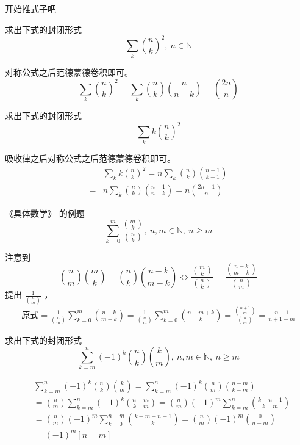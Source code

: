 \documentclass[UTF8]{beamer}
\begin{document}
    \begin{frame}
        \sout{开始推式子吧}
        \begin{block}{求出下式的封闭形式}\vspace{-1em}
            $$\sum_k\binom nk^2,\ n\in\mathbb{N}$$
            \vspace{-1em}
        \end{block}
        \pause
        对称公式之后范德蒙德卷积即可。
        $$\sum_k\binom nk^2=\sum_k\binom nk\binom n{n-k}=\binom{2n}n$$
    \end{frame}
    \begin{frame}
        \begin{block}{求出下式的封闭形式}
            $$\sum_kk\binom nk^2$$
        \end{block}
        \pause
        吸收律之后对称公式之后范德蒙德卷积即可。
        \begin{align*}
              & \sum_kk\binom nk^2=n\sum_k\binom nk\binom {n-1}{k-1}\\
            = & n\sum_k\binom nk\binom {n-1}{n-k}=n\binom{2n-1}{n}
        \end{align*}
    \end{frame}
    \begin{frame}
        \begin{block}{《具体数学》 的例题}
            $$\sum_{k=0}^m\frac{\binom mk}{\binom nk},\ n,m\in\mathbb{N},\ n\geq m$$
        \end{block}
        \pause
        注意到
        $$\binom nm\binom mk=\binom nk\binom{n-k}{m-k}\iff\frac{\binom mk}{\binom nk}=\frac{\binom{n-k}{m-k}}{\binom nm}$$
        提出 $\frac{1}{\binom nm}$ ，
        $$
        \begin{aligned}
            \text{原式}=\frac{1}{\binom{n}{m}}\sum_{k=0}^m\binom{n-k}{m-k}=\frac{1}{\binom{n}{m}}\sum_{k=0}^m\binom{n-m+k}{k}=\frac{\binom{n+1}{m}}{\binom nm}=\frac {n+1}{n+1-m}
        \end{aligned}
        $$
    \end{frame}

    \begin{frame}
        \begin{block}{求出下式的封闭形式}\vspace{-1em}
            $$\sum_{k=m}^n(-1)^{k}\binom nk\binom km,\ n,m\in\mathbb{N},\ n\geq m$$
        \end{block}
        \vspace{-1em}
        \pause
        $$
        \begin{aligned}
            & \sum_{k=m}^n(-1)^k\binom nk\binom km =\sum_{k=m}^n(-1)^k\binom nm\binom{n-m}{k-m}\\
            & =\binom nm\sum_{k=m}^n(-1)^k\binom{n-m}{k-m}=\binom nm(-1)^m\sum_{k=m}^n\binom {k-n-1}{k-m}\\
            & =\binom nm(-1)^m\sum_{k=0}^{n-m}\binom{k+m-n-1}{k}=\binom nm(-1)^m\binom{0}{n-m}\\
            & =(-1)^m[n=m]
        \end{aligned}
        $$
    \end{frame}
\end{document}
